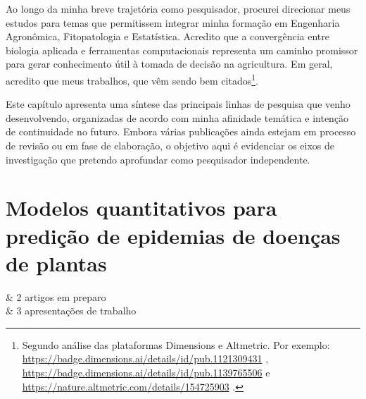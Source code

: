 \documentclass[12pt,a4paper,oneside]{book}
\begin{document}
Ao longo da minha breve trajetória como pesquisador, procurei 
direcionar meus estudos para temas que permitissem integrar minha formação em Engenharia Agronômica, Fitopatologia e 
Estatística. Acredito que a convergência entre biologia aplicada e ferramentas computacionais representa um 
caminho promissor para gerar conhecimento útil à tomada de decisão na agricultura. Em geral, acredito que 
meus trabalhos, que vêm sendo bem citados\footnote{Segundo análise das plataformas Dimensions e Altmetric. Por exemplo:
\url{https://badge.dimensions.ai/details/id/pub.1121309431} \citep{Garnica2019},
\url{https://badge.dimensions.ai/details/id/pub.1139765506} \citep{Matthiesen2021} e
\url{https://nature.altmetric.com/details/154725903} \citep{McCoy2023}.}.

Este capítulo apresenta uma síntese das principais linhas de pesquisa que venho desenvolvendo, 
organizadas de acordo com minha afinidade temática e intenção de continuidade no futuro. Embora 
várias publicações ainda estejam em processo de revisão ou em fase de elaboração, o objetivo aqui 
é evidenciar os eixos de investigação que pretendo aprofundar como pesquisador independente.
  
\section{Modelos quantitativos para predição de epidemias de doenças de plantas}
\label{sec_modelagem}
  
\begin{summarybox}[frametitle=\faInfoCircle{}\quad Resumo da linha de pesquisa]
\begin{fa-ul}
  \faFilePdf & 2 artigos em preparo \\
  \faComment & 3 apresentações de trabalho \\
\end{fa-ul}
\end{summarybox}
  
\end{document}
